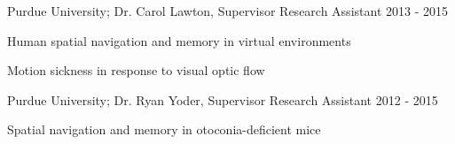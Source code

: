 \begin{cventries}
  \cventry
    {Purdue University; Dr. Carol Lawton, Supervisor} %
    {Research Assistant} %
    {} %
    {2013 - 2015} %
    {
      \begin{cvitems} %
        \item {Human spatial navigation and memory in virtual environments}
        \item {Motion sickness in response to visual optic flow}
      \end{cvitems}
    }    
    
  \cventry
    {Purdue University; Dr. Ryan Yoder, Supervisor} %
    {Research Assistant} %
    {} %
    {2012 - 2015} %
    {
      \begin{cvitems} %
        \item {Spatial navigation and memory in otoconia-deficient mice}
      \end{cvitems}
    }    

\end{cventries}
